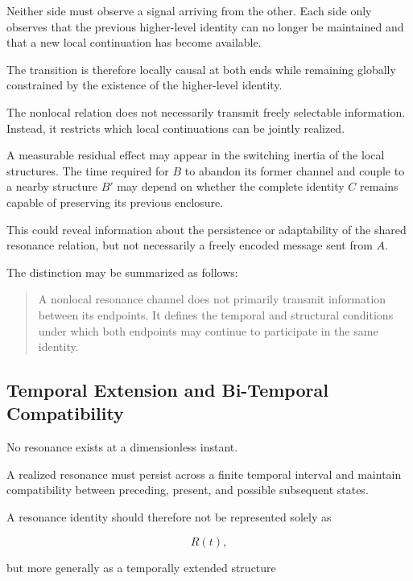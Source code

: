 \documentclass[11pt,a4paper]{article}
\begin{document}
Neither side must observe a signal arriving from the other. Each side only observes that the previous higher-level identity can no longer be maintained and that a new local continuation has become available.

The transition is therefore locally causal at both ends while remaining globally constrained by the existence of the higher-level identity.

The nonlocal relation does not necessarily transmit freely selectable information. Instead, it restricts which local continuations can be jointly realized.

A measurable residual effect may appear in the switching inertia of the local structures. The time required for $B$ to abandon its former channel and couple to a nearby structure $B'$ may depend on whether the complete identity $C$ remains capable of preserving its previous enclosure.

This could reveal information about the persistence or adaptability of the shared resonance relation, but not necessarily a freely encoded message sent from $A$.

The distinction may be summarized as follows:

\begin{quote}
A nonlocal resonance channel does not primarily transmit information between its endpoints. It defines the temporal and structural conditions under which both endpoints may continue to participate in the same identity.
\end{quote}


\subsection{Temporal Extension and Bi-Temporal Compatibility}
\label{sec:bitemporal_compatibility}

No resonance exists at a dimensionless instant.

A realized resonance must persist across a finite temporal interval and maintain compatibility between preceding, present, and possible subsequent states.

A resonance identity should therefore not be represented solely as

\begin{equation}
    R(t),
\end{equation}

but more generally as a temporally extended structure
\end{document}
